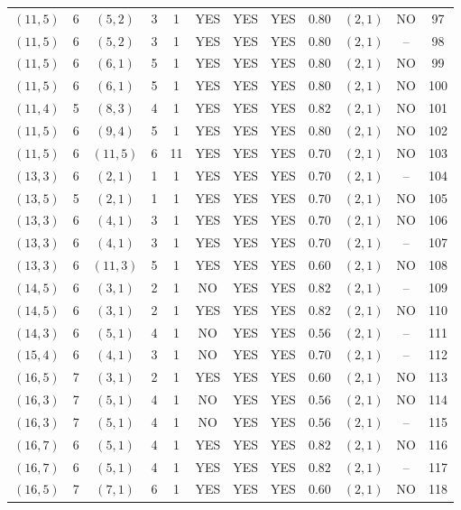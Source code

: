 \begin{longtable}{|c|c|c|c|c|c|c|c|c|c|c|c|}
$(11,5)$ & 6 & $(5,2)$ & 3 & 1 & YES & YES & YES & $0.80$ & $(2,1)$ & NO & 97\\
$(11,5)$ & 6 & $(5,2)$ & 3 & 1 & YES & YES & YES & $0.80$ & $(2,1)$ & -- & 98\\
$(11,5)$ & 6 & $(6,1)$ & 5 & 1 & YES & YES & YES & $0.80$ & $(2,1)$ & NO & 99\\
$(11,5)$ & 6 & $(6,1)$ & 5 & 1 & YES & YES & YES & $0.80$ & $(2,1)$ & NO & 100\\
$(11,4)$ & 5 & $(8,3)$ & 4 & 1 & YES & YES & YES & $0.82$ & $(2,1)$ & NO & 101\\
$(11,5)$ & 6 & $(9,4)$ & 5 & 1 & YES & YES & YES & $0.80$ & $(2,1)$ & NO & 102\\
$(11,5)$ & 6 & $(11,5)$ & 6 & 11 & YES & YES & YES & $0.70$ & $(2,1)$ & NO & 103\\
$(13,3)$ & 6 & $(2,1)$ & 1 & 1 & YES & YES & YES & $0.70$ & $(2,1)$ & -- & 104\\
$(13,5)$ & 5 & $(2,1)$ & 1 & 1 & YES & YES & YES & $0.70$ & $(2,1)$ & NO & 105\\
$(13,3)$ & 6 & $(4,1)$ & 3 & 1 & YES & YES & YES & $0.70$ & $(2,1)$ & NO & 106\\
$(13,3)$ & 6 & $(4,1)$ & 3 & 1 & YES & YES & YES & $0.70$ & $(2,1)$ & -- & 107\\
$(13,3)$ & 6 & $(11,3)$ & 5 & 1 & YES & YES & YES & $0.60$ & $(2,1)$ & NO & 108\\
$(14,5)$ & 6 & $(3,1)$ & 2 & 1 & NO & YES & YES & $0.82$ & $(2,1)$ & -- & 109\\
$(14,5)$ & 6 & $(3,1)$ & 2 & 1 & YES & YES & YES & $0.82$ & $(2,1)$ & NO & 110\\
$(14,3)$ & 6 & $(5,1)$ & 4 & 1 & NO & YES & YES & $0.56$ & $(2,1)$ & -- & 111\\
$(15,4)$ & 6 & $(4,1)$ & 3 & 1 & NO & YES & YES & $0.70$ & $(2,1)$ & -- & 112\\
$(16,5)$ & 7 & $(3,1)$ & 2 & 1 & YES & YES & YES & $0.60$ & $(2,1)$ & NO & 113\\
$(16,3)$ & 7 & $(5,1)$ & 4 & 1 & NO & YES & YES & $0.56$ & $(2,1)$ & NO & 114\\
$(16,3)$ & 7 & $(5,1)$ & 4 & 1 & NO & YES & YES & $0.56$ & $(2,1)$ & -- & 115\\
$(16,7)$ & 6 & $(5,1)$ & 4 & 1 & YES & YES & YES & $0.82$ & $(2,1)$ & NO & 116\\
$(16,7)$ & 6 & $(5,1)$ & 4 & 1 & YES & YES & YES & $0.82$ & $(2,1)$ & -- & 117\\
$(16,5)$ & 7 & $(7,1)$ & 6 & 1 & YES & YES & YES & $0.60$ & $(2,1)$ & NO & 118\\

\end{longtable}

